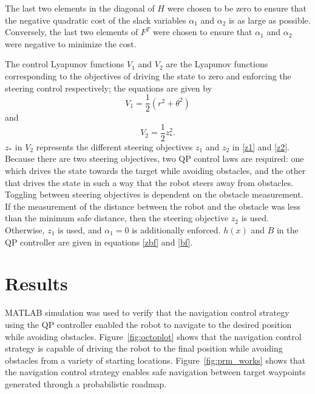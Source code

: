 \documentclass[conference]{IEEEtran}
\begin{document}
The last two elements in the diagonal of $H$ were chosen to be zero to ensure that the negative quadratic cost of the slack variables $\alpha_1$ and $\alpha_2$ is as large as possible. Conversely, the last two elements of $F^T$ were chosen to ensure that $\alpha_1$ and $\alpha_2$ were negative to minimize the cost.

The control Lyapunov functions $V_1$ and $V_2$ are the Lyapunov functions corresponding to the objectives of driving the state to zero and enforcing the steering control respectively; the equations are given by 
\begin{equation}
V_1=\frac{1}{2}(r^2+\theta^2)
\end{equation} and
\begin{equation}
V_2=\frac{1}{2}z_*^2.
\end{equation}
$z_*$ in $V_2$ represents the different steering objectives $z_1$ and $z_2$ in \eqref{z1} and \eqref{z2}. Because there are two steering objectives, two QP control laws are required: one which drives the state towards the target while avoiding obstacles, and the other that drives the state in such a way that the robot steers away from obstacles. Toggling between steering objectives is dependent on the obstacle measurement. If the measurement of the distance between the robot and the obstacle was less than the minimum safe distance, then the steering objective $z_2$ is used. Otherwise, $z_1$ is used, and $\alpha_1=0$ is additionally enforced. $h(x)$ and $B$ in the QP controller are given in equations \eqref{zbf} and \eqref{bf}. 

\section{Results}
MATLAB simulation was used to verify that the navigation control strategy using the QP controller enabled the robot to navigate to the desired position while avoiding obstacles. Figure~\ref{fig:octoplot} shows that the navigation control strategy is capable of driving the robot to the final position while avoiding obstacles from a variety of starting locations. Figure~\ref{fig:prm_works} shows that the navigation control strategy enables safe navigation between target waypoints generated through a probabilistic roadmap.
\end{document}
